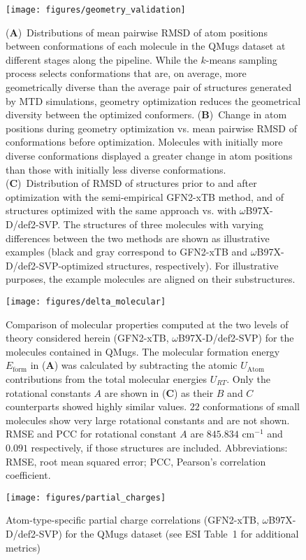 \begin{figure}[ht]
\centering
\texttt{[image: figures/geometry\_validation]}
\caption{
    (\textbf{A})~Distributions of mean pairwise RMSD of atom positions between conformations of each molecule in the QMugs dataset at different stages along the pipeline. While the $k$-means sampling process selects conformations that are, on average, more geometrically diverse than the average pair of structures generated by MTD simulations, geometry optimization reduces the geometrical diversity between the optimized conformers.
    (\textbf{B})~Change in atom positions during geometry optimization vs. mean pairwise RMSD of conformations before optimization. Molecules with initially more diverse conformations displayed a greater change in atom positions than those with initially less diverse conformations. 
    (\textbf{C})~Distribution of RMSD of structures prior to and after optimization with the semi-empirical GFN2-xTB method, and of structures optimized with the same approach vs. with $\omega$B97X-D/def2-SVP. The structures of three molecules with varying differences between the two methods are shown as illustrative examples (black and gray correspond to GFN2-xTB and $\omega$B97X-D/def2-SVP-optimized structures, respectively). For illustrative purposes, the example molecules are aligned on their substructures.
}
\label{fig:geometry_validation}
\end{figure}


\begin{figure}[ht]
\centering
\texttt{[image: figures/delta\_molecular]}
\caption{Comparison of molecular properties computed at the two levels of theory considered herein (GFN2-xTB, $\omega$B97X-D/def2-SVP) for the molecules contained in QMugs. The molecular formation energy $E_{\mathrm{form}}$ in (\textbf{A}) was calculated by subtracting the atomic $U_{\mathrm{Atom}}$ contributions from the  total molecular energies $U_{RT}$. Only the rotational constants $A$ are shown in (\textbf{C}) as their $B$ and $C$ counterparts showed highly similar values. $22$ conformations of small molecules show very large rotational constants and are not shown. RMSE and PCC for rotational constant $A$ are $845.834$ cm$^{-1}$ and $0.091$ respectively, if those structures are included. Abbreviations: RMSE, root mean squared error; PCC, Pearson's correlation coefficient.}
\label{fig:delta_molecular_props}
\end{figure}


\begin{figure}[ht]
\centering
\texttt{[image: figures/partial\_charges]}
\caption{Atom-type-specific partial charge correlations (GFN2-xTB, $\omega$B97X-D/def2-SVP) for the QMugs dataset (see ESI Table~1 for additional metrics)}
\label{fig:partial}
\end{figure}


